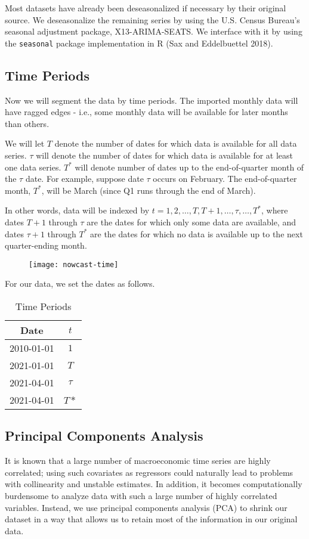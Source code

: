 \documentclass[11pt, letterpaper]{article}\usepackage[]{graphicx}\usepackage[]{color}
\begin{document}
Most datasets have already been deseasonalized if necessary by their original source. We deseasonalize the remaining series by using the U.S. Census Bureau's seasonal adjustment package, X13-ARIMA-SEATS. We interface with it by using the \texttt{seasonal} package implementation in R (Sax and Eddelbuettel 2018).

\subsection{Time Periods}
Now we will segment the data by time periods. The imported monthly data will have ragged edges - i.e., some monthly data will be available for later months than others.

We will let $T$ denote the number of dates for which data is available for all data series. $\tau$ will denote the number of dates for which data is available for at least one data series. $T^*$ will denote number of dates up to the end-of-quarter month of the $\tau$ date. For example, suppose date $\tau$ occurs on February. The end-of-quarter month, $T^*$, will be March (since Q1 runs through the end of March). 

In other words, data will be indexed by $t = 1, 2, \dots, T, T+1, \dots, \tau, \dots, T^*$, where dates $T + 1$ through $\tau$ are the dates for which only some data are available, and dates $\tau + 1$ through $T^*$ are the dates for which no data is available up to the next quarter-ending month.
\begin{figure}[H]
\texttt{[image: nowcast-time]}
\centering
\end{figure}
For our data, we set the dates as follows.
\begin{table}[H]
\centering
\begingroup\footnotesize
\begin{tabular}{cc}
  \hline
Date & $t$ \\ 
  \hline
2010-01-01 & $1$ \\ 
  2021-01-01 & $T$ \\ 
  2021-04-01 & $\tau$ \\ 
  2021-04-01 & $T*$ \\ 
   \hline
\end{tabular}
\endgroup
\caption{Time Periods} 
\end{table}


\subsection{Principal Components Analysis}
It is known that a large number of macroeconomic time series are highly correlated; using such covariates as regressors could naturally lead to problems with collinearity and unstable estimates. In addition, it becomes computationally burdensome to analyze data with such a large number of highly correlated variables. Instead, we use principal components analysis (PCA) to shrink our dataset in a way that allows us to retain most of the information in our original data.
\end{document}
